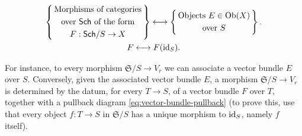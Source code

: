 \documentclass[12pt]{memoir}
\begin{document}
\begin{ptcb}
\begin{gather*}
        \left\{\,\begin{gathered}
            \text{Morphisms of categories}\\
            \text{over }\mathsf{Sch}\text{ of the form}\\
            F:\mathsf{Sch}/S\to X
        \end{gathered}\,\right\}
        \longleftrightarrow
        \left\{\,\begin{gathered}
            \text{Objects }E\in\operatorname{Ob}(X)\\
            \text{over }S
        \end{gathered}\,\right\}.\\
    F\longleftrightarrow F(\operatorname{id}_S).
    \end{gather*}
    \endgroup
\end{ptcb}

\begin{nonum-Ex}\label{ex:morphOverCategoriesSchSToVr}
    For instance, to every morphism $\mathfrak{S}/S \to V_r$ we can associate a vector bundle $E$ over $S$. Conversely, given the associated vector bundle $E$, a morphism $\mathfrak{S}/S \to V_r$ is determined by the datum, for every $T \to S$, of a vector bundle $F$ over $T$, together with a pullback diagram \eqref{eq:vector-bundle-pullback} (to prove this, use that every object $f\colon T \to S$ in $\mathfrak{S}/S$ has a unique morphism to $\operatorname{id}_S$, namely $f$ itself).
\end{nonum-Ex}
\end{document}
